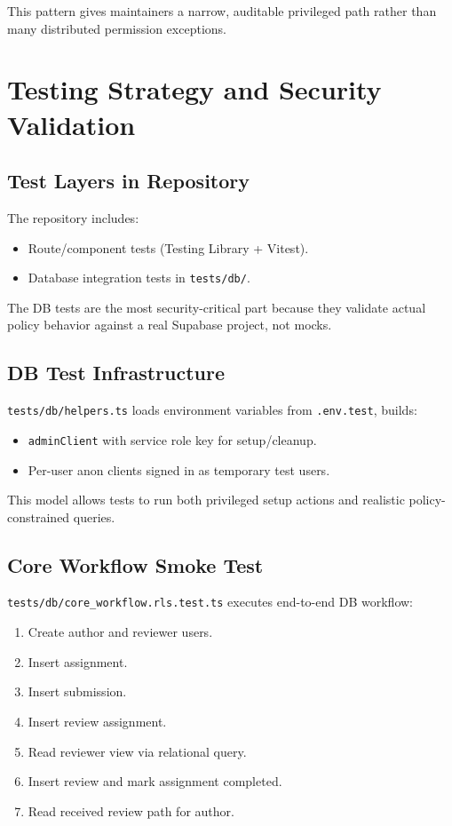 \documentclass[11pt]{article}
\begin{document}
This pattern gives maintainers a narrow, auditable privileged path rather than many distributed permission exceptions.

\section{Testing Strategy and Security Validation}
\subsection{Test Layers in Repository}
The repository includes:
\begin{itemize}[leftmargin=*]
  \item Route/component tests (Testing Library + Vitest).
  \item Database integration tests in \texttt{tests/db/}.
\end{itemize}

The DB tests are the most security-critical part because they validate actual policy behavior against a real Supabase project, not mocks.

\subsection{DB Test Infrastructure}
\texttt{tests/db/helpers.ts} loads environment variables from \texttt{.env.test}, builds:
\begin{itemize}[leftmargin=*]
  \item \texttt{adminClient} with service role key for setup/cleanup.
  \item Per-user anon clients signed in as temporary test users.
\end{itemize}

This model allows tests to run both privileged setup actions and realistic policy-constrained queries.

\subsection{Core Workflow Smoke Test}
\texttt{tests/db/core\_workflow.rls.test.ts} executes end-to-end DB workflow:
\begin{enumerate}[leftmargin=*]
  \item Create author and reviewer users.
  \item Insert assignment.
  \item Insert submission.
  \item Insert review assignment.
  \item Read reviewer view via relational query.
  \item Insert review and mark assignment completed.
  \item Read received review path for author.
\end{enumerate}
\end{document}

